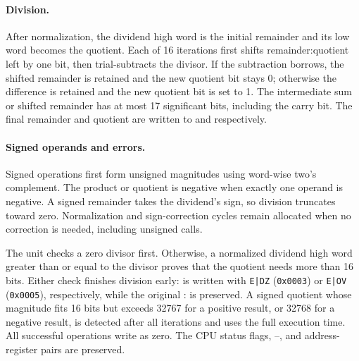 \paragraph{Division.}
After normalization, the dividend high word is the initial remainder and its low word becomes the quotient. Each of 16
iterations first shifts remainder:quotient left by one bit, then trial-subtracts the divisor. If the subtraction
borrows, the shifted remainder is retained and the new quotient bit stays 0; otherwise the difference is retained and
the new quotient bit is set to 1. The intermediate sum or shifted remainder has at most 17 significant bits, including
the carry bit. The final remainder and quotient are written to  and  respectively.

\paragraph{Signed operands and errors.}
Signed operations first form unsigned magnitudes using word-wise two's complement. The product or quotient is negative
when exactly one operand is negative. A signed remainder takes the dividend's sign, so division truncates toward zero.
Normalization and sign-correction cycles remain allocated when no correction is needed, including unsigned calls.

The unit checks a zero divisor first. Otherwise, a normalized dividend high word greater than or equal to the divisor
proves that the quotient needs more than 16 bits. Either check finishes division early:  is written with
\texttt{E|DZ} (\texttt{0x0003}) or \texttt{E|OV} (\texttt{0x0005}), respectively, while the original :
is preserved. A signed quotient whose magnitude fits 16 bits but exceeds 32767 for a positive result, or 32768 for a
negative result, is detected after all iterations and uses the full execution time. All successful operations write
 as zero. The CPU status flags, --, and address-register pairs are preserved.

